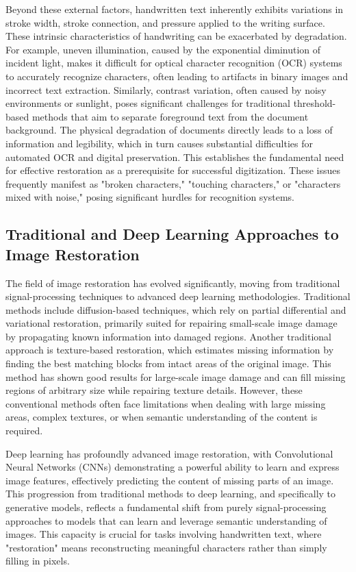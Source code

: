 \documentclass[conference]{IEEEtran}
\begin{document}
Beyond these external factors, handwritten text inherently exhibits variations in stroke width, stroke connection, and pressure applied to the writing surface. These intrinsic characteristics of handwriting can be exacerbated by degradation. For example, uneven illumination, caused by the exponential diminution of incident light, makes it difficult for optical character recognition (OCR) systems to accurately recognize characters, often leading to artifacts in binary images and incorrect text extraction.\cite{Davis2020} Similarly, contrast variation, often caused by noisy environments or sunlight, poses significant challenges for traditional threshold-based methods that aim to separate foreground text from the document background.\cite{Davis2020} The physical degradation of documents directly leads to a loss of information and legibility, which in turn causes substantial difficulties for automated OCR and digital preservation. This establishes the fundamental need for effective restoration as a prerequisite for successful digitization. These issues frequently manifest as "broken characters," "touching characters," or "characters mixed with noise," posing significant hurdles for recognition systems.


\subsection{Traditional and Deep Learning Approaches to Image Restoration}
\justify
The field of image restoration has evolved significantly, moving from traditional signal-processing techniques to advanced deep learning methodologies. Traditional methods include diffusion-based techniques, which rely on partial differential and variational restoration, primarily suited for repairing small-scale image damage by propagating known information into damaged regions. Another traditional approach is texture-based restoration, which estimates missing information by finding the best matching blocks from intact areas of the original image. This method has shown good results for large-scale image damage and can fill missing regions of arbitrary size while repairing texture details. However, these conventional methods often face limitations when dealing with large missing areas, complex textures, or when semantic understanding of the content is required.

Deep learning has profoundly advanced image restoration, with Convolutional Neural Networks (CNNs) demonstrating a powerful ability to learn and express image features, effectively predicting the content of missing parts of an image.\cite{Davis2020} This progression from traditional methods to deep learning, and specifically to generative models, reflects a fundamental shift from purely signal-processing approaches to models that can learn and leverage semantic understanding of images. This capacity is crucial for tasks involving handwritten text, where "restoration" means reconstructing meaningful characters rather than simply filling in pixels.
\end{document}
